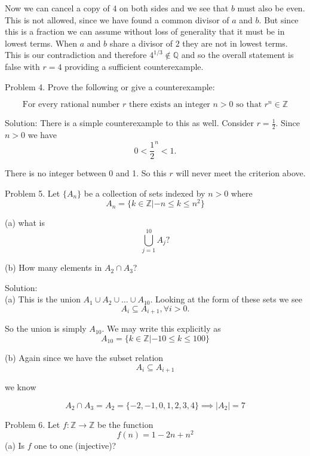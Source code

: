 \documentclass[16 pt]{amsart}
\theoremstyle{definition}
\theoremstyle{remark}
\numberwithin{equation}{subsection}
\newcommand{\Z}{\mathbb{Z}}
\newcommand{\Q}{\mathbb{Q}}
\begin{document}
Now we can cancel a copy of $4$ on both sides and we see that $b$ must also be even.  This is not allowed, since we have found a common divisor of $a$ and $b$.  But since this is a fraction we can assume without loss of generality that it must be in lowest terms.  When $a$ and $b$ share a divisor of $2$ they are not in lowest terms.  This is our contradiction and therefore $4^{1/3}\notin \Q$ and so the overall statement is false with $r=4$ providing a sufficient counterexample.

\newpage


Problem 4. Prove the following or give a counterexample:

\[
\text{For every rational number } r \text{ there exists an integer } n>0 \text{ so that } r^n \in \Z
\]


\vspace{.5in}

Solution:  There is a simple counterexample to this as well.  Consider $r= \frac{1}{2}$.  Since $n>0$ we have
\[
0 < \frac{1}{2}^n <1.
\]

There is no integer between 0 and 1.  So this $r$ will never meet the criterion above.

\newpage

Problem 5. Let $\{A_n \}$ be a collection of sets indexed by $n>0 $ where 
\[
A_n = \{ k\in\Z | -n \le k \le n^2\}
\]



(a) what is 
\[
\bigcup_{j=1}^{10} A_j ?
\]

(b) How many elements in $A_2 \cap A_3$?

\vspace{.5in}
 
Solution:\\

(a) This is the union $A_1 \cup A_2 \cup \dots \cup A_{10}$.  Looking at the form of these sets we see
\[
A_i \subseteq A_{i+1}, \forall i>0.
\]

So the union is simply $A_{10}$.  We may write this explicitly as
\[
A_{10} = \{k\in\Z | -10 \le k \le 100\}
\]


(b) Again since we have the subset relation 
\[
A_i \subseteq A_{i+1}
\]

we know

\[
A_2 \cap A_3 = A_2 = \{-2,-1,0,1,2,3,4\} \implies |A_2|=7
\]

\newpage


Problem 6. Let $f:\Z \rightarrow \Z$ be the function
\[
f(n) = 1 - 2n + n^2
\]
(a) Is $f$ one to one (injective)?\\
\end{document}
